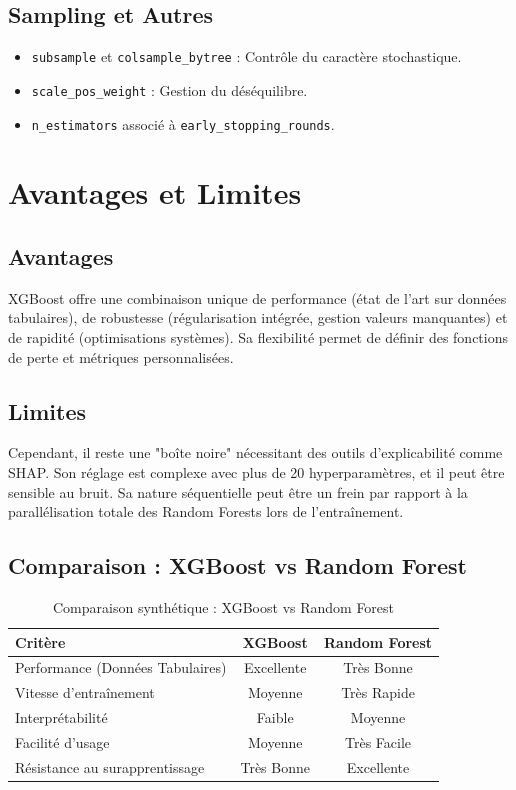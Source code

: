 \subsection{Sampling et Autres}
\begin{itemize}
    \item \texttt{subsample} et \texttt{colsample\_bytree} : Contrôle du caractère stochastique.
    \item \texttt{scale\_pos\_weight} : Gestion du déséquilibre.
    \item \texttt{n\_estimators} associé à \texttt{early\_stopping\_rounds}.
\end{itemize}

\section{Avantages et Limites}

\subsection{Avantages}
XGBoost offre une combinaison unique de performance (état de l'art sur données tabulaires), de robustesse (régularisation intégrée, gestion valeurs manquantes) et de rapidité (optimisations systèmes). Sa flexibilité permet de définir des fonctions de perte et métriques personnalisées.

\subsection{Limites}
Cependant, il reste une "boîte noire" nécessitant des outils d'explicabilité comme SHAP. Son réglage est complexe avec plus de 20 hyperparamètres, et il peut être sensible au bruit. Sa nature séquentielle peut être un frein par rapport à la parallélisation totale des Random Forests lors de l'entraînement.

\subsection{Comparaison : XGBoost vs Random Forest}
\begin{table}[htbp]
\centering
\begin{tabular}{|l|c|c|}
\hline
\textbf{Critère} & \textbf{XGBoost} & \textbf{Random Forest} \\
\hline
Performance (Données Tabulaires) & Excellente & Très Bonne \\
Vitesse d'entraînement & Moyenne & Très Rapide \\
Interprétabilité & Faible & Moyenne \\
Facilité d'usage & Moyenne & Très Facile \\
Résistance au surapprentissage & Très Bonne & Excellente \\
\hline
\end{tabular}
\caption{Comparaison synthétique : XGBoost vs Random Forest}
\label{tab:xgb_vs_rf}
\end{table}

